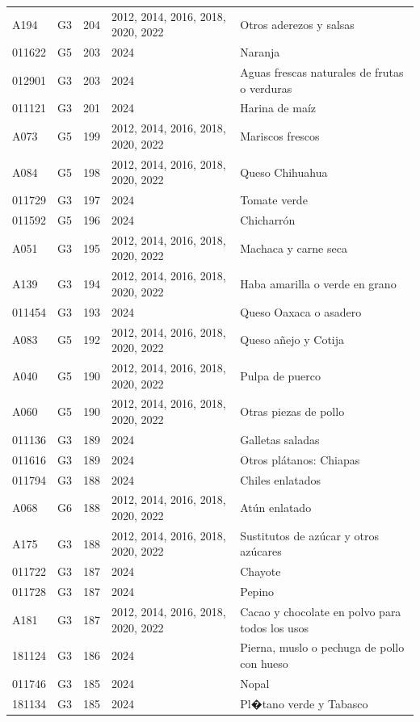 \begin{table}[ht]
\begin{tabular}{llrll}
  A194 & G3 & 204 & 2012, 2014, 2016, 2018, 2020, 2022 & Otros aderezos y salsas \\ 
  011622 & G5 & 203 & 2024 & Naranja \\ 
  012901 & G3 & 203 & 2024 & Aguas frescas naturales de frutas o verduras \\ 
  011121 & G3 & 201 & 2024 & Harina de maíz \\ 
  A073 & G5 & 199 & 2012, 2014, 2016, 2018, 2020, 2022 & Mariscos frescos \\ 
  A084 & G5 & 198 & 2012, 2014, 2016, 2018, 2020, 2022 & Queso Chihuahua \\ 
  011729 & G3 & 197 & 2024 & Tomate verde \\ 
  011592 & G5 & 196 & 2024 & Chicharrón \\ 
  A051 & G3 & 195 & 2012, 2014, 2016, 2018, 2020, 2022 & Machaca y carne seca \\ 
  A139 & G3 & 194 & 2012, 2014, 2016, 2018, 2020, 2022 & Haba amarilla o verde en grano \\ 
  011454 & G3 & 193 & 2024 & Queso Oaxaca o asadero \\ 
  A083 & G5 & 192 & 2012, 2014, 2016, 2018, 2020, 2022 & Queso añejo y Cotija \\ 
  A040 & G5 & 190 & 2012, 2014, 2016, 2018, 2020, 2022 & Pulpa de puerco \\ 
  A060 & G5 & 190 & 2012, 2014, 2016, 2018, 2020, 2022 & Otras piezas de pollo \\ 
  011136 & G3 & 189 & 2024 & Galletas saladas \\ 
  011616 & G3 & 189 & 2024 & Otros plátanos: Chiapas \\ 
  011794 & G3 & 188 & 2024 & Chiles enlatados \\ 
  A068 & G6 & 188 & 2012, 2014, 2016, 2018, 2020, 2022 & Atún enlatado \\ 
  A175 & G3 & 188 & 2012, 2014, 2016, 2018, 2020, 2022 & Sustitutos de azúcar y otros azúcares \\ 
  011722 & G3 & 187 & 2024 & Chayote \\ 
  011728 & G3 & 187 & 2024 & Pepino \\ 
  A181 & G3 & 187 & 2012, 2014, 2016, 2018, 2020, 2022 & Cacao y chocolate en polvo para todos los usos \\ 
  181124 & G3 & 186 & 2024 & Pierna, muslo o pechuga de pollo con hueso \\ 
  011746 & G3 & 185 & 2024 & Nopal \\ 
  181134 & G3 & 185 & 2024 & Pl�tano verde y Tabasco \\ 

\end{tabular}
\end{table}
